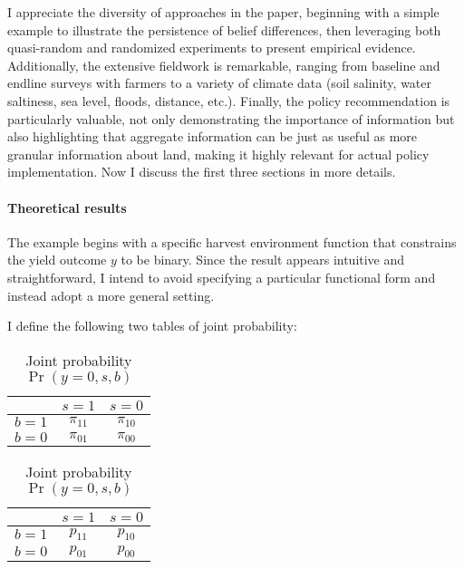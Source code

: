 \documentclass[12pt]{article}[margin=1in]
\begin{document}
I appreciate the diversity of approaches in the paper, beginning with a simple example to illustrate the persistence of belief differences, then leveraging both quasi-random and randomized experiments to present empirical evidence. Additionally, the extensive fieldwork is remarkable, ranging from baseline and endline surveys with farmers to a variety of climate data (soil salinity, water saltiness, sea level, floods, distance, etc.). Finally, the policy recommendation is particularly valuable, not only demonstrating the importance of information but also highlighting that aggregate information can be just as useful as more granular information about land, making it highly relevant for actual policy implementation.
Now I discuss the first three sections in more details.

\paragraph{Theoretical results} 
The example begins with a specific harvest environment function that constrains the yield outcome $y$ to be binary. Since the result appears intuitive and straightforward, I intend to avoid specifying a particular functional form and instead adopt a more general setting. 

I define the following two tables of joint probability:

\begin{table}[h]
    \centering
    \begin{minipage}{.45\textwidth}
        \centering
        \begin{tabular}{c|cc}
             & $s=1$ & $s=0$  \\
            \midrule
            $b=1$ & $\pi_{11}$ & $\pi_{10}$ \\
            $b=0$ & $\pi_{01}$ & $\pi_{00}$ \\
        \end{tabular}
        \caption{Joint probability $\Pr(y=1,s,b)$}
        \label{tab:first}
    \end{minipage}%
    \hfill
    \begin{minipage}{.45\textwidth}
        \centering
        \begin{tabular}{c|cc}
             & $s=1$ & $s=0$  \\
            \midrule
            $b=1$ & $p_{11}$ & $p_{10}$ \\
            $b=0$ & $p_{01}$ & $p_{00}$ \\
        \end{tabular}
        \caption{Joint probability $\Pr(y=0,s,b)$}
        \label{tab:second}
    \end{minipage}
\end{table}
\end{document}
